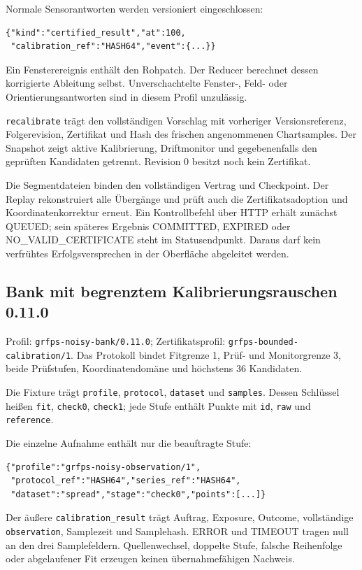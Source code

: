 \documentclass[11pt,a4paper]{article}
\begin{document}
Normale Sensorantworten werden versioniert eingeschlossen:
\begin{lstlisting}
{"kind":"certified_result","at":100,
 "calibration_ref":"HASH64","event":{...}}
\end{lstlisting}
Ein Fensterereignis enthält den Rohpatch. Der Reducer berechnet
dessen korrigierte Ableitung selbst. Unverschachtelte Fenster-,
Feld- oder Orientierungsantworten sind in diesem Profil unzulässig.

\texttt{recalibrate} trägt den vollständigen Vorschlag mit
vorheriger Versionsreferenz, Folgerevision, Zertifikat und
Hash des frischen angenommenen Chartsamples. Der Snapshot zeigt
aktive Kalibrierung, Driftmonitor und gegebenenfalls den geprüften
Kandidaten getrennt. Revision 0 besitzt noch kein Zertifikat.

Die Segmentdateien binden den vollständigen Vertrag und
Checkpoint. Der Replay rekonstruiert alle Übergänge und prüft
auch die Zertifikatsadoption und Koordinatenkorrektur erneut.
Ein Kontrollbefehl über HTTP erhält zunächst QUEUED; sein späteres
Ergebnis COMMITTED, EXPIRED oder NO\_VALID\_CERTIFICATE steht
im Statusendpunkt. Daraus darf kein verfrühtes Erfolgsversprechen
in der Oberfläche abgeleitet werden.

\clearpage\subsection{Bank mit begrenztem Kalibrierungsrauschen 0.11.0}
Profil: \texttt{grfps-noisy-bank/0.11.0}; Zertifikatsprofil:
\texttt{grfps-bounded-calibration/1}. Das Protokoll bindet
Fitgrenze 1, Prüf- und Monitorgrenze 3, beide Prüfstufen,
Koordinatendomäne und höchstens 36 Kandidaten.

Die Fixture trägt \texttt{profile}, \texttt{protocol},
\texttt{dataset} und \texttt{samples}. Dessen Schlüssel heißen
\texttt{fit}, \texttt{check0}, \texttt{check1}; jede Stufe enthält
Punkte mit \texttt{id}, \texttt{raw} und \texttt{reference}.

Die einzelne Aufnahme enthält nur die beauftragte Stufe:
\begin{lstlisting}
{"profile":"grfps-noisy-observation/1",
 "protocol_ref":"HASH64","series_ref":"HASH64",
 "dataset":"spread","stage":"check0","points":[...]}
\end{lstlisting}
Der äußere \texttt{calibration\_result} trägt Auftrag, Exposure,
Outcome, vollständige \texttt{observation}, Samplezeit und
Samplehash. ERROR und TIMEOUT tragen null an den drei Samplefeldern.
Quellenwechsel, doppelte Stufe, falsche Reihenfolge oder abgelaufener
Fit erzeugen keinen übernahmefähigen Nachweis.
\end{document}
